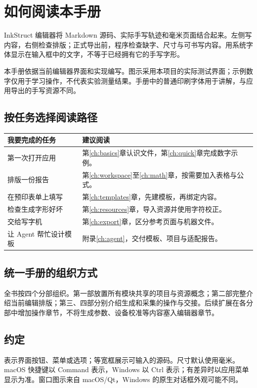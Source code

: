 \chapter*{如何阅读本手册}
InkStruct 编辑器将 Markdown 源码、实际手写轨迹和毫米页面结合起来。左侧写内容，右侧检查排版；正式导出前，程序检查缺字、尺寸与可书写内容。用系统字体显示在输入框中的文字，不等于已经拥有它的手写字形。

本手册依据当前编辑器界面和实现编写。图示采用本项目的实际测试界面；示例数字仅用于学习操作，不代表实验测量结果。手册中的普通印刷字体用于讲解，与应用导出的手写资源不同。

\section*{按任务选择阅读路径}
\par\noindent\begin{tabularx}{\linewidth}{@{}P{36mm}Y@{}}
\toprule
我要完成的任务 & 建议阅读\\\midrule
第一次打开应用 & 第\ref{ch:basics}章认识文件，第\ref{ch:quick}章完成数字示例。\\
排版一份报告 & 第\ref{ch:workspace}至\ref{ch:math}章，按需要加入表格与公式。\\
在预印表单上填写 & 第\ref{ch:templates}章，先建模板，再绑定内容。\\
检查生成字形好坏 & 第\ref{ch:resources}章，导入资源并使用字符校正。\\
交给写字机 & 第\ref{ch:export}章，区分参考页面与机器文件。\\
让 Agent 帮忙设计模板 & 附录\ref{ch:agent}，交付模板、项目与适配报告。\\
\bottomrule
\end{tabularx}

\section*{统一手册的组织方式}
全书按四个分部组织。第一部放置所有模块共享的项目与资源概念；第二部完整介绍当前编辑排版；第三、四部分别介绍生成和采集的操作与交接。后续扩展在各分部中增加操作章节，不将生成参数、设备校准等内容塞入编辑器章节。


\section*{约定}
表示界面按钮、菜单或选项；等宽框展示可输入的源码。尺寸默认使用毫米。macOS 快捷键以 Command 表示，Windows 以 Ctrl 表示；有差异时以应用菜单显示为准。窗口图示来自 macOS/Qt，Windows 的原生对话框外观可能不同。

